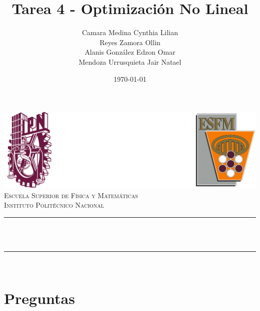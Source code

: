 \documentclass[12pt]{article}
\title{Tarea 4 - Optimización No Lineal}
\author{Camara Medina Cynthia Lilian \\
Reyes Zamora Ollin \\
Alanis González Edzon Omar \\[0.2cm]
Mendoza Urrusquieta Jair Natael}
\date{\today}
\makeatletter
\let\thetitle\@title
\let\theauthor\@author
\let\thedate\@date
\makeatother
\begin{document}
\begin{titlepage}
\centering
\includegraphics[width=0.9\linewidth]{logo.png}\\[2.0 cm]
\textsc{\LARGE Escuela Superior de Física y Matemáticas}\\[1.2 cm]
\textsc{\Large Instituto Politécnico Nacional}\\[2.5 cm]
\rule{\linewidth}{0.2 mm} \\[0.4 cm]
{\huge \bfseries \thetitle}\\
\rule{\linewidth}{0.2 mm} \\[2.5 cm]
\textsc{\large \theauthor}
\vfill
{\large \thedate}
\end{titlepage}

\section*{Preguntas}
\end{document}
